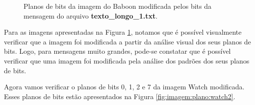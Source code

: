 \documentclass{article}
\begin{document}
\begin{figure}[htp]
	\caption{Planos de bits da imagem do Baboon modificada pelos bits da mensagem do arquivo \textbf{texto\_longo\_1.txt}.}%
	\label{fig:imagem:plano:baboon2}%
\end{figure}

Para as imagens apresentadas na Figura \ref{fig:imagem:plano:baboon2}, notamos que é possível visualmente verificar que a imagem foi modificada a partir da análise visual dos seus planos de bits. Logo, para mensagens muito grandes, pode-se constatar que é possível verificar que uma imagem foi modificada pela análise dos padrões dos seus planos de bits.

\newpage
Agora vamos verificar o planos de bits 0, 1, 2 e 7 da imagem Watch modificada. Esses planos de bits estão apresentados na Figura \ref{fig:imagem:plano:watch2}. 

\begin{figure}[htp]%
	\centering
	\qquad
	\qquad
	

\end{figure}
\end{document}
